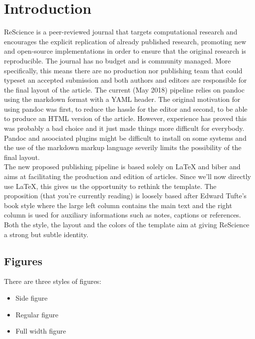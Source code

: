 \section{Introduction}

ReScience  is a peer-reviewed journal that targets
computational research and encourages the explicit replication of already
published research, promoting new and open-source implementations in order to
ensure that the original research is reproducible. The journal has no budget
and is community managed. More specifically, this means there are no production
nor publishing team that could typeset an accepted submission and both authors
and editors are responsible for the final layout of the article. The current
(May 2018) pipeline relies on pandoc  using the markdown
format with a YAML header. The original motivation for using pandoc was first,
to reduce the hassle for the editor and second, to be able to produce an HTML
version of the article. However, experience has proved this was probably a bad
choice and it just made things more difficult for everybody. Pandoc and
asoociated plugins might be difficult to install on some systems and the use of
the markdown markup language severily limits the possibility of the final
layout.\\

The new proposed publishing pipeline is based solely on {\LaTeX } and biber and
aims at facilitating the production and edition of articles.  Since we'll now
directly use {\LaTeX }, this gives us the opportunity to rethink the template.
The proposition (that you're currently reading) is loosely based after
Edward Tufte’s book style where the large left column contains the main text
and the right column is used for auxiliary informations such as notes, captions
or references. Both the style, the layout and the colors of the template aim at
giving ReScience a strong but subtle identity.



\subsection*{Figures}

There are three styles of figures:
\begin{itemize}
\item Side figure
\item Regular figure
\item Full width figure
\end{itemize}

